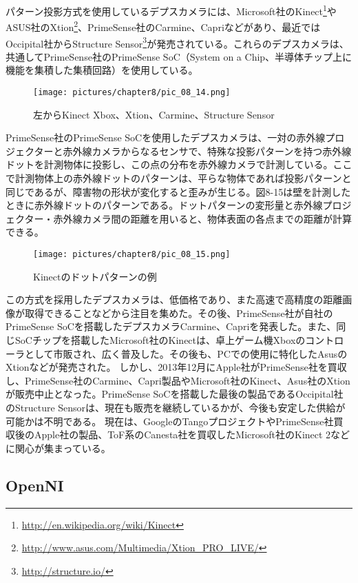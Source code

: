 パターン投影方式を使用しているデプスカメラには、Microsoft社のKinect\footnote{\url{http://en.wikipedia.org/wiki/Kinect}}やASUS社のXtion\footnote{\url{http://www.asus.com/Multimedia/Xtion\_PRO\_LIVE/}}、PrimeSense社のCarmine、Capriなどがあり、最近ではOccipital社からStructure Sensor\footnote{\url{http://structure.io/}}が発売されている。これらのデプスカメラは、共通してPrimeSense社のPrimeSense SoC（System on a Chip、半導体チップ上に機能を集積した集積回路）を使用している。

\begin{figure}[htp]
  \centering
  \texttt{[image: pictures/chapter8/pic\_08\_14.png]}
  \caption{左からKinect Xbox、Xtion、Carmine、Structure Sensor}
\end{figure}

PrimeSense社のPrimeSense SoCを使用したデプスカメラは、一対の赤外線プロジェクターと赤外線カメラからなるセンサで、特殊な投影パターンを持つ赤外線ドットを計測物体に投影し、この点の分布を赤外線カメラで計測している。ここで計測物体上の赤外線ドットのパターンは、平らな物体であれば投影パターンと同じであるが、障害物の形状が変化すると歪みが生じる。図8-15は壁を計測したときに赤外線ドットのパターンである。ドットパターンの変形量と赤外線プロジェクター・赤外線カメラ間の距離を用いると、物体表面の各点までの距離が計算できる。

\begin{figure}[htp]
  \centering
  \texttt{[image: pictures/chapter8/pic\_08\_15.png]}
  \caption{Kinectのドットパターンの例}
\end{figure}


この方式を採用したデプスカメラは、低価格であり、また高速で高精度の距離画像が取得できることなどから注目を集めた。その後、PrimeSense社が自社のPrimeSense SoCを搭載したデプスカメラCarmine、Capriを発表した。また、同じSoCチップを搭載したMicrosoft社のKinectは、卓上ゲーム機Xboxのコントローラとして市販され、広く普及した。その後も、PCでの使用に特化したAsusのXtionなどが発売された。
しかし、2013年12月にApple社がPrimeSense社を買収し、PrimeSense社のCarmine、Capri製品やMicrosoft社のKinect、Asus社のXtionが販売中止となった。PrimeSense SoCを搭載した最後の製品であるOccipital社のStructure Sensorは、現在も販売を継続しているかが、今後も安定した供給が可能かは不明である。
現在は、GoogleのTangoプロジェクトやPrimeSense社買収後のApple社の製品、ToF系のCanesta社を買収したMicrosoft社のKinect 2などに関心が集まっている。

\subsection{OpenNI}

